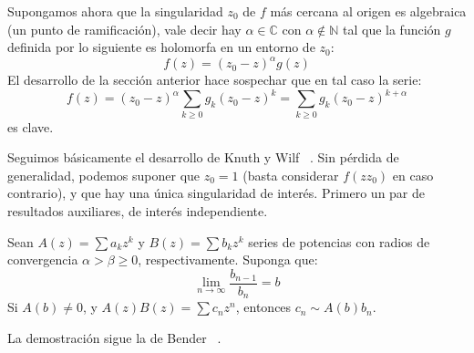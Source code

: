   Supongamos ahora
  que la singularidad \(z_0\) de \(f\) más cercana al origen
  es algebraica
  (un punto de ramificación),
  vale decir hay \(\alpha \in \mathbb{C}\)
  con \(\alpha \notin \mathbb{N}\)
  tal que la función \(g\) definida por lo siguiente
  es holomorfa en un entorno de \(z_0\):
  \begin{equation*}
    f(z)
      = (z_0 - z)^\alpha g(z)
  \end{equation*}
  El desarrollo de la sección anterior
  hace sospechar que en tal caso la serie:
  \begin{equation*}
    f(z)
      = (z_0 - z)^\alpha \sum_{k \ge 0} g_k (z_0 - z)^k
      = \sum_{k \ge 0} g_k (z_0 - z)^{k + \alpha}
  \end{equation*}
  es clave.

  Seguimos básicamente el desarrollo de Knuth y Wilf~%
    \cite{knuth89:_short_proof_Darboux}.
  Sin pérdida de generalidad,
  podemos suponer que \(z_0 = 1\)
  (basta considerar \(f(z z_0)\) en caso contrario),
  y que hay una única singularidad de interés.
  Primero un par de resultados auxiliares,
  de interés independiente.
  \begin{theorem}[Bender]
    \label{theo:Bender}
    Sean \(A(z) = \sum a_k z^k\) y \(B(z) = \sum b_k z^k\)
    series de potencias
    con radios de convergencia \(\alpha > \beta \ge 0\),
    respectivamente.
    Suponga que:
    \begin{equation*}
      \lim_{n \rightarrow \infty} \frac{b_{n - 1}}{b_n} = b
    \end{equation*}
    Si \(A(b) \ne 0\),
    y \(A(z) B(z) = \sum c_n z^n\),
    entonces \(c_n \sim A(b) b_n\).
  \end{theorem}
  La demostración sigue la de Bender~%
    \cite{bender74:_asymp_method_enumer}.
